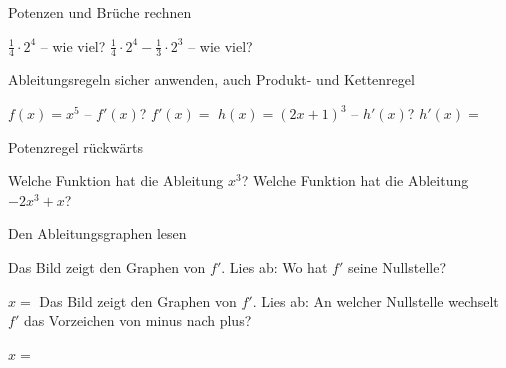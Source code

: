 \setcounter{aufgabe}{0}

\begin{aufgabe}{Potenzen und Brüche rechnen}
\begin{teile}
\teil $\frac{1}{4} \cdot 2^4$ – wie viel? \leerfeld
\teil $\frac{1}{4} \cdot 2^4 - \frac{1}{3} \cdot 2^3$ – wie viel? \leerfeld
\end{teile}
\end{aufgabe}

\begin{aufgabe}{Ableitungsregeln sicher anwenden, auch Produkt- und Kettenregel}
\begin{teile}
\teil $f(x) = x^5$ – $f'(x)$? $f'(x) = $ \leerfeld
\teil $h(x) = (2x + 1)^3$ – $h'(x)$? $h'(x) = $ \leerfeld
\end{teile}
\end{aufgabe}

\begin{aufgabe}{Potenzregel rückwärts}
\begin{teile}
\teil Welche Funktion hat die Ableitung $x^3$? \leerfeld
\teil Welche Funktion hat die Ableitung $-2x^3 + x$? \leerfeld
\end{teile}
\end{aufgabe}

\begin{aufgabe}{Den Ableitungsgraphen lesen}
\begin{teile}
\teil Das Bild zeigt den Graphen von $f'$. Lies ab: Wo hat $f'$ seine Nullstelle?

\begin{ksys}[xmin=-2,xmax=5,ymin=-3,ymax=3,ablesen]  \end{ksys}
$x = $ \leerfeld
\teil Das Bild zeigt den Graphen von $f'$. Lies ab: An welcher Nullstelle wechselt $f'$ das Vorzeichen von minus nach plus?

\begin{ksys}[xmin=-3,xmax=5,ymin=-3,ymax=3,ablesen]  \end{ksys}
$x = $ \leerfeld
\end{teile}
\end{aufgabe}

